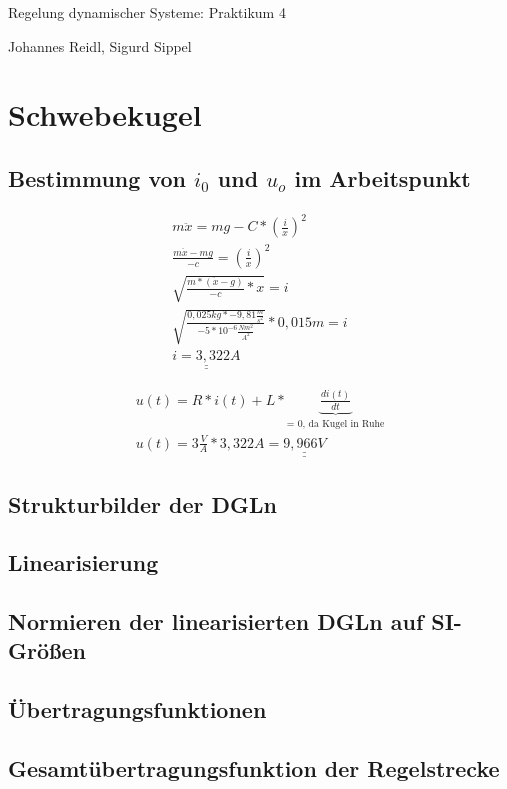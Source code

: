 \documentclass[10pt,a4paper]{article}
\begin{document}
\begin{center}
Regelung dynamischer Systeme: Praktikum 4

Johannes Reidl, Sigurd Sippel
\end{center}

\section{Schwebekugel}
\subsection{Bestimmung von $i_0$ und  $u_o$ im Arbeitspunkt}
\begin{figure}[H]
  \begin{align}
	  m\ddot{x} = mg - C * (\frac{i}{x})^2 \nonumber \\
	  \frac{m\ddot{x} - mg}{-c} = (\frac{i}{x})^2 \nonumber \\
	  \sqrt{\frac{m* (\ddot{x} - g)}{-c} * x} = i \nonumber \\
	  \sqrt{\frac{0,025kg * -9,81\frac{m}{s^2}}{-5 * 10^{-6}\frac{Nm^2}{A^2}}} * 0,015m = i \nonumber \\
	  \underline{\underline{i = 3,322A}} \nonumber
  \end{align}
\end{figure}

\begin{figure}[H]
  \begin{align}
	  u(t) = R * i(t) + L * \underbrace{\frac{di(t)}{dt}}_\text{= 0, da Kugel in Ruhe} \nonumber \\
	  u(t) = 3\frac{V}{A} * 3,322A = \underline{\underline{9,966V}} \nonumber
  \end{align}
\end{figure}
\subsection{Strukturbilder der DGLn}


\subsection{Linearisierung}


\subsection{Normieren der linearisierten DGLn auf SI-Größen}


\subsection{Übertragungsfunktionen}


\subsection{Gesamtübertragungsfunktion der Regelstrecke}
\end{document}
